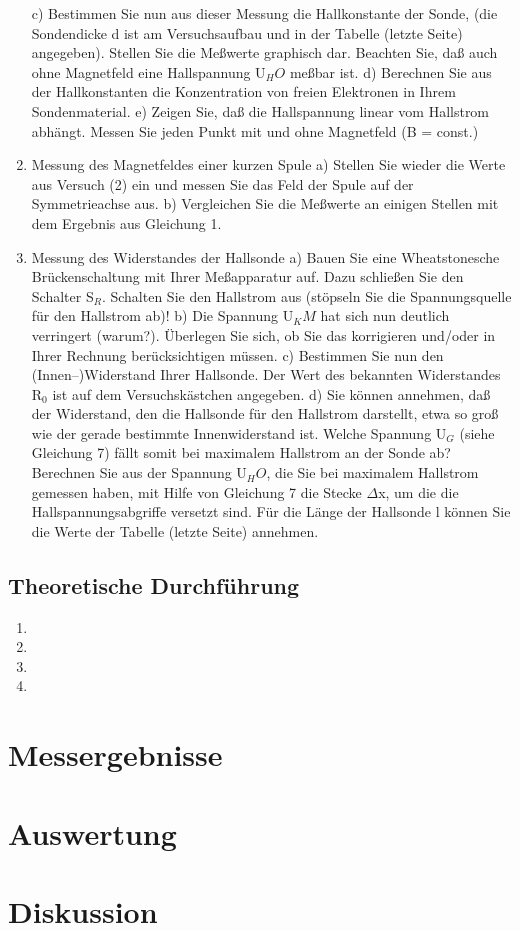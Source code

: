 \documentclass[12pt]{scrartcl}
\begin{document}
\begin{enumerate}
c) Bestimmen Sie nun aus dieser Messung die Hallkonstante der Sonde, (die Sondendicke
d ist am Versuchsaufbau und in der Tabelle (letzte Seite) angegeben). Stellen Sie die Meßwerte graphisch dar. Beachten Sie, daß auch ohne Magnetfeld eine Hallspannung
U$_HO$ meßbar ist.
d) Berechnen Sie aus der Hallkonstanten die Konzentration von freien Elektronen in Ihrem Sondenmaterial.
e) Zeigen Sie, daß die Hallspannung linear vom Hallstrom abhängt. Messen Sie
jeden Punkt mit und ohne Magnetfeld (B = const.)
\item Messung des Magnetfeldes einer kurzen Spule \newline
a) Stellen Sie wieder die Werte aus Versuch (2) ein und messen Sie das Feld der Spule auf der Symmetrieachse aus.
b) Vergleichen Sie die Meßwerte an einigen Stellen mit dem Ergebnis aus Gleichung 1.
\item Messung des Widerstandes der Hallsonde \newline
a) Bauen Sie eine Wheatstonesche Brückenschaltung mit Ihrer Meßapparatur
auf. Dazu schließen Sie den Schalter
S$_R$. Schalten Sie den Hallstrom aus (stöpseln Sie die Spannungsquelle für den Hallstrom ab)!
b) Die Spannung U$_KM$ hat sich nun deutlich verringert (warum?).
Überlegen Sie sich, ob Sie das korrigieren und/oder in Ihrer Rechnung berücksichtigen
müssen.
c) Bestimmen Sie nun den (Innen–)Widerstand Ihrer Hallsonde. Der Wert des bekannten Widerstandes R$_0$ ist auf dem Versuchskästchen angegeben.
d) Sie können annehmen, daß der Widerstand, den die Hallsonde für den Hallstrom darstellt, etwa so groß wie der gerade bestimmte Innenwiderstand ist. Welche Spannung U$_G$ (siehe Gleichung 7) fällt somit bei maximalem Hallstrom an der Sonde ab? Berechnen Sie aus der Spannung U$_HO$, die Sie bei maximalem Hallstrom gemessen haben, mit Hilfe von Gleichung 7 die Stecke
$\Delta$x, um die die Hallspannungsabgriffe versetzt sind. Für die Länge der Hallsonde
l können Sie die Werte der Tabelle (letzte Seite) annehmen.
\end{enumerate}

\subsection{Theoretische Durchführung}

\begin{enumerate}
\item
\item
\item
\item
\end{enumerate}

\section{Messergebnisse}



\section{Auswertung}


\section{Diskussion}


\end{document}
